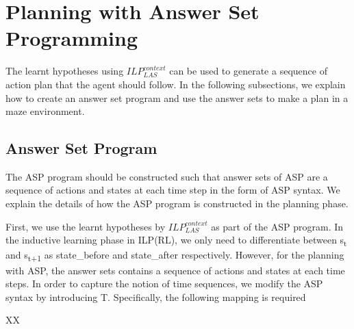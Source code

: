 \section{Planning with Answer Set Programming}
\label{sec:planning}

The learnt hypotheses using $ILP_{LAS}^{context}$ can be used to generate a sequence of action plan that the agent should follow.
In the following subsections, we explain how to create an answer set program and use the answer sets to make a plan in a maze environment.
\subsection{Answer Set Program}
\label{subsec:answer_set_program}
The ASP program should be constructed such that answer sets of ASP are a sequence of actions and states at each time step in the form of ASP syntax. 
We explain the details of how the ASP program is constructed in the planning phase.

First, we use the learnt hypotheses by $ILP_{LAS}^{context}$ as part of the ASP program.
In the inductive learning phase in ILP(RL), we only need to differentiate between s\textsubscript{t} and s\textsubscript{t+1} as \textsf{state\_before} and \textsf{state\_after} respectively.
However, for the planning with ASP, the answer sets contains a sequence of actions and states at each time steps. 
In order to capture the notion of time sequences, we modify the ASP syntax by 
introducing T. Specifically, the following mapping is required 

XX

